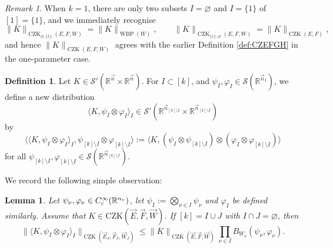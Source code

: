 \documentclass[11pt, reqno]{amsart}
\newtheorem{lemma}[theorem]{Lemma}
\theoremstyle{definition}
\newtheorem{definition}[theorem]{Definition}
\theoremstyle{remark}
\newtheorem{remark}[theorem]{Remark}
\numberwithin{equation}{section}
\newcommand{\vE}{\vec E}
\newcommand{\vF}{\vec F}
\newcommand{\R}{\mathbb R}
\newcommand{\vn}{\vec n}
\newcommand{\pair}[2]{\langle #1, #2 \rangle}
\newcommand{\Bpair}[2]{\Big\langle #1, #2 \Big\rangle}
\newcommand{\Norm}[2]{\|#1\|_{#2}}
\begin{document}
\begin{remark}\label{rem:CZKk=1}
When $k=1$, there are only two subsets $I=\varnothing$ and $I=\{1\}$ of $[1]=\{1\}$, and we immediately recognise
\begin{equation*}
  \Norm{K}{\operatorname{CZK}_{\varnothing,\{1\}}(E,F,W)}
  =\Norm{K}{\operatorname{WBP}(W)},\qquad
  \Norm{K}{\operatorname{CZK}_{\{1\},\varnothing}(E,F,W)}
  =\Norm{K}{\operatorname{CZK}(E,F)},
\end{equation*}
and hence $\Norm{K}{\operatorname{CZK}(E,F,W)}$ agrees with the earlier Definition \ref{def:CZEFGH} in the one-parameter case.
\end{remark}


\begin{definition}\label{KE}
Let $K\in\mathscr S'(\mathbb R^{\vn}\times\mathbb R^{\vn})$.
For $I\subset[k]$, and $\psi_I,\varphi_I\in\mathscr S(\R^{\vn_I})$, we define a new distribution
\begin{equation*}
  \pair{K}{\psi_I\otimes\varphi_I}_I \in \mathscr S'(\R^{\vn_{[k]\setminus I}}\times \R^{\vn_{[k]\setminus I}})
\end{equation*}
by
\begin{equation*}
  \Bpair{  \pair{K}{\psi_I\otimes\varphi_I}_I }{\psi_{[k]\setminus I}\otimes\varphi_{[k]\setminus I}}
  :=  \pair{K}{(\psi_I\otimes\psi_{[k]\setminus I})\otimes(\varphi_I\otimes \varphi_{[k]\setminus I})}
\end{equation*}
for all $\psi_{[k]\setminus I},\varphi_{[k]\setminus I}\in\mathscr S(\R^{\vn_{[k]\setminus I}})$.
\end{definition}

We record the following simple observation:

\begin{lemma}\label{lem:CZKrest}
Let $\psi_\nu,\varphi_\nu\in C_{\rm c}^\infty(\R^{n_\nu})$, let $\psi_I:=\bigotimes_{\nu\in I}\psi_\nu$ and $\varphi_I$ be defined similarly.
Assume that $K\in \mathrm{CZK}(\vec E,\vec F,\vec W)$. If $[k]=I\cup J$ with $I\cap J=\varnothing$, then
\begin{equation*}
  \Norm{\pair{K}{\psi_I\otimes\varphi_I}_I}{\operatorname{CZK}(\vE_J,\vF_J,\vec W_J)}
  \leq\Norm{K}{\operatorname{CZK}(\vE,\vF,\vec W)}\prod_{\nu\in I}B_{W_\nu}(\psi_\nu,\varphi_\nu).
\end{equation*}
\end{lemma}
\end{document}
